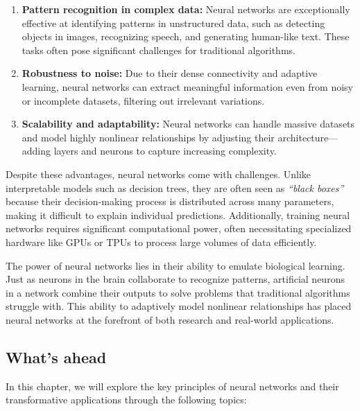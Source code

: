 \documentclass[
]{book}
\theoremstyle{definition}
\theoremstyle{definition}
\theoremstyle{definition}
\theoremstyle{definition}
\theoremstyle{remark}
\begin{document}
\begin{enumerate}
\def\labelenumi{\arabic{enumi}.}
\item
  \textbf{Pattern recognition in complex data:} Neural networks are exceptionally effective at identifying patterns in unstructured data, such as detecting objects in images, recognizing speech, and generating human-like text. These tasks often pose significant challenges for traditional algorithms.
\item
  \textbf{Robustness to noise:} Due to their dense connectivity and adaptive learning, neural networks can extract meaningful information even from noisy or incomplete datasets, filtering out irrelevant variations.
\item
  \textbf{Scalability and adaptability:} Neural networks can handle massive datasets and model highly nonlinear relationships by adjusting their architecture---adding layers and neurons to capture increasing complexity.
\end{enumerate}

Despite these advantages, neural networks come with challenges. Unlike interpretable models such as decision trees, they are often seen as \emph{``black boxes''} because their decision-making process is distributed across many parameters, making it difficult to explain individual predictions. Additionally, training neural networks requires significant computational power, often necessitating specialized hardware like GPUs or TPUs to process large volumes of data efficiently.

The power of neural networks lies in their ability to emulate biological learning. Just as neurons in the brain collaborate to recognize patterns, artificial neurons in a network combine their outputs to solve problems that traditional algorithms struggle with. This ability to adaptively model nonlinear relationships has placed neural networks at the forefront of both research and real-world applications.

\subsection*{What's ahead}\label{whats-ahead}

In this chapter, we will explore the key principles of neural networks and their transformative applications through the following topics:
\end{document}
